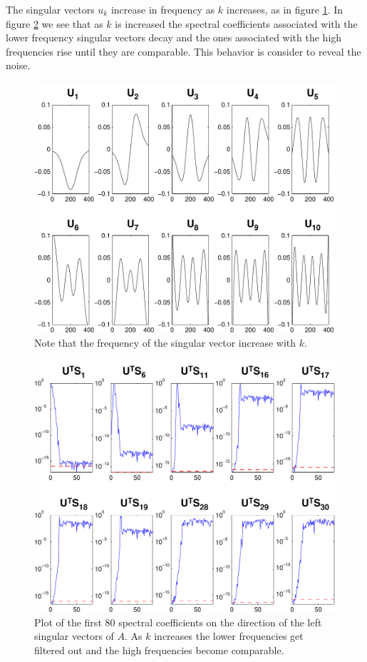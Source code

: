 \documentclass[11pt]{amsart}
\begin{document}
The singular vectors $u_{k}$ increase in frequency as $k$ increases, as 
in figure \ref{fig:singularVectors}.
In figure \ref{fig:spectralCoeffs} we see that as $k$
is increased the spectral coefficients associated with the lower frequency 
singular vectors decay and the ones associated with the high frequencies rise 
until they are comparable. This behavior is consider to reveal the noise.
\begin{figure}[b] 
  \begin{center}
    \includegraphics[width=0.55\linewidth]{figures/run1/sing_vecs}
  \end{center}
\caption{Note that the frequency of the singular vector increase with $k$.}
\label{fig:singularVectors}
\end{figure}
\begin{figure}[htb]
  \begin{center}
    \includegraphics[width=0.55\linewidth]{figures/run1/spec_sk}
  \end{center}
\caption{Plot of the first 80 spectral coefficients on the direction of the left
singular vectors of $A$. As $k$ increases the lower frequencies get filtered out
and the high frequencies become comparable.}
 \label{fig:spectralCoeffs}
\end{figure}
\end{document}
